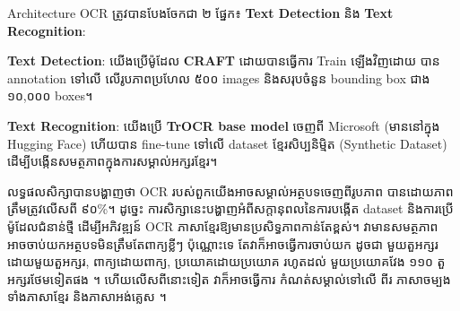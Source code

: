 \begin{adjustwidth}{0.2cm}{0.2cm}
    Architecture OCR ត្រូវបានបែងចែកជា ២ ផ្នែក៖ \textbf{Text Detection} និង \textbf{Text Recognition}:\par
    
    \textbf{Text Detection}: យើងប្រើម៉ូដែល \textbf{CRAFT} ដោយបានធ្វើការ Train ឡើងវិញដោយ បាន annotation ទៅលើ 
    លើរូបភាពប្រហែល ៥០០ images និងសរុបចំនួន bounding box ជាង ១០,០០០ boxes។\par
    
    \textbf{Text Recognition}: យើងប្រើ \textbf{TrOCR base model} ចេញពី Microsoft (មាននៅក្នុង Hugging Face) ហើយបាន
    fine-tune ទៅលើ dataset ខ្មែរសិប្បនិម្មិត (Synthetic Dataset) ដើម្បីបង្កើនសមត្ថភាពក្នុងការសម្គាល់អក្សរខ្មែរ។\par
    
    លទ្ធផលសិក្សាបានបង្ហាញថា OCR របស់ពួកយើងអាចសម្គាល់អត្ថបទចេញពីរូបភាព បានដោយភាពត្រឹមត្រូវលើសពី ៩០\%។ 
    ដូច្នេះ ការសិក្សានេះបង្ហាញអំពីសក្តានុពលនៃការបង្កើត dataset និងការប្រើម៉ូដែលជំនាន់ថ្មី ដើម្បីអភិវឌ្ឍន៍ OCR ភាសាខ្មែរឱ្យមានប្រសិទ្ធភាពកាន់តែខ្ពស់។
    វាមានសមត្ថភាព អាចចាប់យកអត្ថបទមិនត្រឹមតែពាក្យខ្លីៗ ប៉ុណ្ណោះទេ តែវាក៏អាចធ្វើការចាប់យក ដូចជា មួយតួអក្សរដោយមួយតួអក្សរ, ពាក្យដោយពាក្យ, ប្រយោគដោយប្រយោគ រហូតដល់ មួយប្រយោគវែង ១១០ តួអក្សរថែមទៀតផង ។ ហើយលើសពីនោះទៀត វាក៏អាចធ្វើការ កំណត់សម្គាល់ទៅលើ ពីរ ភាសាចម្បង ទាំងភាសាខ្មែរ និងភាសាអង់គ្លេស ។    
    \vspace{2cm}
    

\end{adjustwidth}
